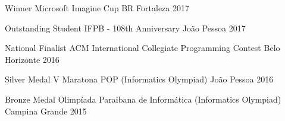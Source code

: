 \begin{cvhonors}

  \cvhonor
    {Winner}
    {Microsoft Imagine Cup BR}
    {Fortaleza}
    {2017} %

  \cvhonor
    {Outstanding Student}
    {IFPB - 108th Anniversary}
    {João Pessoa}
    {2017} %
%

  \cvhonor
    {National Finalist}
    {ACM International Collegiate Programming Contest}
    {Belo Horizonte}
    {2016} %
%

  \cvhonor
    {Silver Medal}
    {V Maratona POP (Informatics Olympiad)}
    {João Pessoa}
    {2016} %
%
%
%
%

  \cvhonor
    {Bronze Medal}
    {Olimpíada Paraibana de Informática (Informatics Olympiad)}
    {Campina Grande}
    {2015} %
%
%
%
%
\end{cvhonors}
